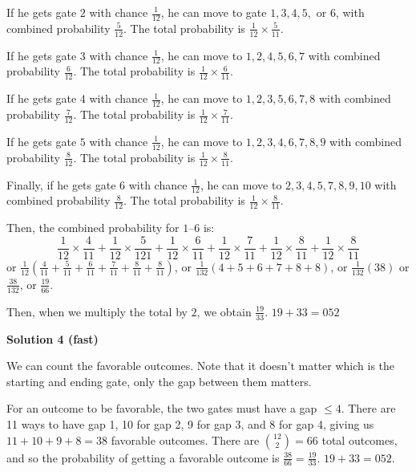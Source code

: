 \begin{enumerate}
 If he gets gate \( 2 \) with chance \( \frac{1}{12} \), he can move to gate \( 1, 3, 4, 5, \) or \( 6 \), with combined probability \( \frac{5}{12} \). The total probability is \( \frac{1}{12} \times \frac{5}{11} \).

 If he gets gate \( 3 \) with chance \( \frac{1}{12} \), he can move to \( 1, 2, 4, 5, 6, 7 \) with combined probability \( \frac{6}{12} \). The total probability is \( \frac{1}{12} \times \frac{6}{11} \).

 If he gets gate \( 4 \) with chance \( \frac{1}{12} \), he can move to \( 1, 2, 3, 5, 6, 7, 8 \) with combined probability \( \frac{7}{12} \). The total probability is \( \frac{1}{12} \times \frac{7}{11} \).

 If he gets gate \( 5 \) with chance \( \frac{1}{12} \), he can move to \( 1, 2, 3, 4, 6, 7, 8, 9 \) with combined probability \( \frac{8}{12} \). The total probability is \( \frac{1}{12} \times \frac{8}{11} \).

 Finally, if he gets gate \( 6 \) with chance \( \frac{1}{12} \), he can move to \( 2, 3, 4, 5, 7, 8, 9, 10 \) with combined probability \( \frac{8}{12} \). The total probability is \( \frac{1}{12} \times \frac{8}{11} \).

 Then, the combined probability for \( 1 \text{--} 6 \) is:
 \[\frac{1}{12} \times \frac{4}{11} + \frac{1}{12} \times \frac{5}{121} + \frac{1}{12} \times \frac{6}{11} + \frac{1}{12} \times \frac{7}{11} + \frac{1}{12} \times \frac{8}{11} + \frac{1}{12} \times \frac{8}{11}\]or \( \frac{1}{12} \left( \frac{4}{11} + \frac{5}{11} + \frac{6}{11} + \frac{7}{11} + \frac{8}{11} +  \frac{8}{11} \right) \), or \( \frac{1}{132} (4 + 5 + 6 + 7 + 8 + 8) \), or \( \frac{1}{132} (38) \) or \( \frac{38}{132} \), or \( \frac{19}{66} \).

 Then, when we multiply the total by \( 2 \), we obtain \( \frac{19}{33} \). $19+33 = \boxed{052}$




\textbf{Solution 4 (fast)}

We can count the favorable outcomes. Note that it doesn't matter which is the starting and ending gate, only the gap between them matters. 

 For an outcome to be favorable, the two gates must have a gap \( \leq 4 \). There are 11 ways to have gap 1, 10 for gap 2, 9 for gap 3, and 8 for gap 4, giving us \( 11 + 10 + 9 + 8 = 38 \) favorable outcomes. There are \( \binom{12}{2} = 66 \) total outcomes, and so the probability of getting a favorable outcome is \( \frac{38}{66} = \frac{19}{33} \). $19+33=\boxed{052}$.


\end{enumerate}
